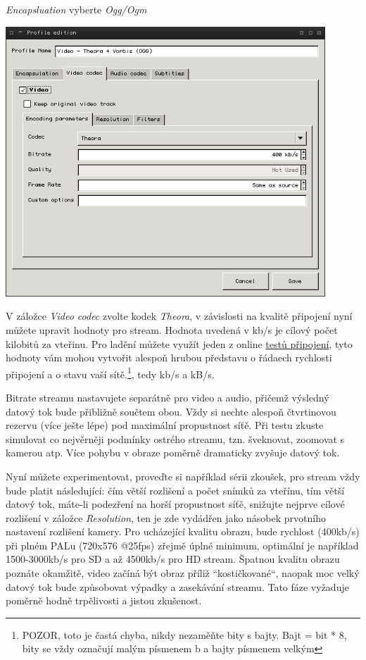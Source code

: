 \documentclass[11pt]{article} %
\begin{document}
{\em Encapsluation} vyberte {\em Ogg/Ogm}


\begin{center}
\includegraphics[width=0.9\textwidth]{9}
\end{center}

V záložce {\em Video codec} zvolte kodek {\em Theora}, v závislosti na kvalitě připojení nyní můžete upravit hodnoty pro stream. Hodnota uvedená v kb/s je cílový počet kilobitů za vteřinu. Pro ladění můžete využít jeden z online \href{http://www.bandwidthplace.com/}{testů připojení}, tyto hodnoty vám mohou vytvořit alespoň hrubou představu o řádaech rychlosti připojení a o stavu vaší sítě.\footnote{POZOR, toto je častá chyba, nikdy nezaměňte bity s bajty. Bajt = bit * 8, bity se vždy označují malým písmenem b a bajty písmenem velkým}, tedy kb/s a kB/s.

Bitrate streamu nastavujete separátně pro video a audio, přičemž výsledný datový tok bude přibližně součtem obou. Vždy si nechte alespoň čtvrtinovou rezervu (více ješte lépe) pod maximální propustnost síťě. Při testu zkuste simulovat co nejvěrněji podmínky ostrého streamu, tzn. šveknovat, zoomovat s kamerou atp. Více pohybu v obraze poměrně dramaticky zvyšuje datový tok.

Nyní můžete experimentovat, proveďte si například sérii zkoušek, pro stream vždy bude platit následující: čím větší rozlišení a počet snímků za vteřínu, tím větší datový tok, máte-li podezření na horší propustnost síťě, snižujte nejprve cílové rozlišení v záložce {\em Resolution}, ten je zde vydádřen jako násobek prvotního nastavení rozlišení kamery. Pro ucházející kvalitu obrazu, bude rychlost (400kb/s) při plném PALu (720x576 @25fps) zřejmě úplné minimum, optimální je například 1500-3000kb/s pro SD a až 4500kb/s pro HD stream. Špatnou kvalitu obrazu poznáte okamžitě, video začíná být obraz příliž ``kostičkované``, naopak moc velký datový tok bude způsobovat výpadky a zasekávání streamu. Tato fáze vyžaduje poměrně hodně trpělivosti a jistou zkušenost.
\end{document}
